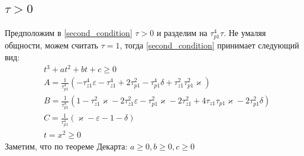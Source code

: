 \documentclass[a4paper,14pt]{extarticle} %
\begin{document}
\subsection{$\tau > 0$}
Предположим в \eqref{second_condition} $\tau > 0$ и разделим на $\tau_{p1}^4\tau$. Не умаляя общности, можем считать $\tau = 1$, тогда \eqref{second_condition} принимает следующий вид:
 \begin{equation}
 \begin{aligned}
&t^3 +at^2 +bt + c  \geq 0\\
&A = \frac{1}{\tau_{p1}^4}(- \tau_{z1}^4\varepsilon - \tau_{z1}^4 + 2\tau_{p1}^2- \tau_{p1}^4\delta + \tau_{z1}^2\tau_{p1}^2\varkappa)\\
&B = \frac{1}{\tau_{p1}^4}( 1- \tau_{z1}^2\varkappa - 2\tau_{z1}^2\varepsilon - \tau_{p1}^2\varkappa- 2\tau_{z1}^2+ 4\tau_{z1}\tau_{p1}\varkappa- 2\tau_{p1}^2\delta)\\
&C = \frac{1}{\tau_{p1}^4}(\varkappa-\varepsilon - 1 - \delta)\\
&t = x^2 \geq 0
 \end{aligned}
\end{equation}
Заметим, что по теореме Декарта: $a \geq 0, b \geq 0, c \geq 0$
\end{document}
